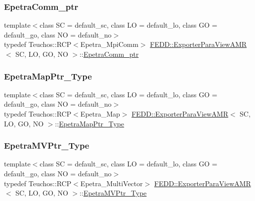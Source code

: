 \subsubsection{\texorpdfstring{Epetra\+Comm\+\_\+ptr}{EpetraComm\_ptr}}
{\footnotesize\ttfamily template$<$class SC  = default\+\_\+sc, class LO  = default\+\_\+lo, class GO  = default\+\_\+go, class NO  = default\+\_\+no$>$ \\
typedef Teuchos\+::\+R\+CP$<$Epetra\+\_\+\+Mpi\+Comm$>$ \hyperlink{classFEDD_1_1ExporterParaViewAMR}{F\+E\+D\+D\+::\+Exporter\+Para\+View\+A\+MR}$<$ SC, LO, GO, NO $>$\+::\hyperlink{classFEDD_1_1ExporterParaViewAMR_a640af1b8a2d7978df32dd6574a176d16}{Epetra\+Comm\+\_\+ptr}}

\mbox{\label{classFEDD_1_1ExporterParaViewAMR_aec66ce374c6eea21bfeeddfe76043c5f}} 
\subsubsection{\texorpdfstring{Epetra\+Map\+Ptr\+\_\+\+Type}{EpetraMapPtr\_Type}}
{\footnotesize\ttfamily template$<$class SC  = default\+\_\+sc, class LO  = default\+\_\+lo, class GO  = default\+\_\+go, class NO  = default\+\_\+no$>$ \\
typedef Teuchos\+::\+R\+CP$<$Epetra\+\_\+\+Map$>$ \hyperlink{classFEDD_1_1ExporterParaViewAMR}{F\+E\+D\+D\+::\+Exporter\+Para\+View\+A\+MR}$<$ SC, LO, GO, NO $>$\+::\hyperlink{classFEDD_1_1ExporterParaViewAMR_aec66ce374c6eea21bfeeddfe76043c5f}{Epetra\+Map\+Ptr\+\_\+\+Type}}

\mbox{\label{classFEDD_1_1ExporterParaViewAMR_a2ae7eacc031d9088ac7d9855bd829600}} 
\subsubsection{\texorpdfstring{Epetra\+M\+V\+Ptr\+\_\+\+Type}{EpetraMVPtr\_Type}}
{\footnotesize\ttfamily template$<$class SC  = default\+\_\+sc, class LO  = default\+\_\+lo, class GO  = default\+\_\+go, class NO  = default\+\_\+no$>$ \\
typedef Teuchos\+::\+R\+CP$<$Epetra\+\_\+\+Multi\+Vector$>$ \hyperlink{classFEDD_1_1ExporterParaViewAMR}{F\+E\+D\+D\+::\+Exporter\+Para\+View\+A\+MR}$<$ SC, LO, GO, NO $>$\+::\hyperlink{classFEDD_1_1ExporterParaViewAMR_a2ae7eacc031d9088ac7d9855bd829600}{Epetra\+M\+V\+Ptr\+\_\+\+Type}}

